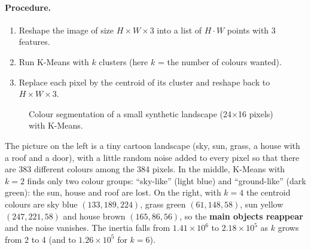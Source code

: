 \paragraph{Procedure.}
\begin{enumerate}
  \item Reshape the image of size $H\times W\times3$ into a list of $H\cdot W$ points with 3 features.
  \item Run K-Means with $k$ clusters (here $k$ = the number of colours wanted).
  \item Replace each pixel by the centroid of its cluster and reshape back to $H\times W\times3$.
\end{enumerate}

\begin{figure}[!htbp]
\centering
{}
\caption{Colour segmentation of a small synthetic landscape (24$\times$16 pixels) with K-Means.}\label{fig:seg}
\end{figure}

\begin{explain}
The picture on the left is a tiny cartoon landscape (sky, sun, grass, a house with a roof and a door), with a little random noise added to every pixel so that there are 383 different colours among the 384 pixels. In the middle, K-Means with $k=2$ finds only two colour groups: ``sky-like'' (light blue) and ``ground-like'' (dark green): the sun, house and roof are lost. On the right, with $k=4$ the centroid colours are sky blue $(133,189,224)$, grass green $(61,148,58)$, sun yellow $(247,221,58)$ and house brown $(165,86,56)$, so the \textbf{main objects reappear} and the noise vanishes. The inertia falls from $1.41\times10^6$ to $2.18\times10^5$ as $k$ grows from 2 to 4 (and to $1.26\times10^5$ for $k=6$).
\end{explain}


